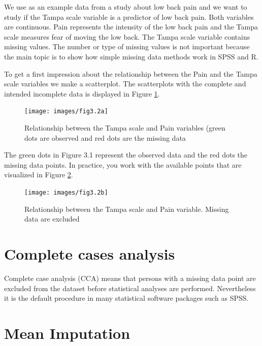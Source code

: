 \documentclass[
]{book}
\begin{document}
We use as an example data from a study about low back pain and we want to study if the Tampa scale variable is a predictor of low back pain. Both variables are continuous. Pain represents the intensity of the low back pain and the Tampa scale measures fear of moving the low back. The Tampa scale variable contains missing values. The number or type of missing values is not important because the main topic is to show how simple missing data methods work in SPSS and R.

To get a first impression about the relationship between the Pain and the Tampa scale variables we make a scatterplot. The scatterplots with the complete and intended incomplete data is displayed in Figure \ref{fig:fig3-1}.

\begin{figure}

{\centering \texttt{[image: images/fig3.2a]} 

}

\caption{Relationship between the Tampa scale and Pain variables (green dots are observed and red dots are the missing data}\label{fig:fig3-1}
\end{figure}

The green dots in Figure 3.1 represent the observed data and the red dots the missing data points. In practice, you work with the available points that are visualized in Figure \ref{fig:fig3-2}.

\begin{figure}

{\centering \texttt{[image: images/fig3.2b]} 

}

\caption{Relationship between the Tampa scale and Pain variable. Missing data are excluded}\label{fig:fig3-2}
\end{figure}

\hypertarget{complete-cases-analysis}{%
\section{Complete cases analysis}\label{complete-cases-analysis}}

Complete case analysis (CCA) means that persons with a missing data point are excluded from the dataset before statistical analyses are performed. Nevertheless it is the default procedure in many statistical software packages such as SPSS.

\hypertarget{mean-imputation}{%
\section{Mean Imputation}\label{mean-imputation}}
\end{document}
